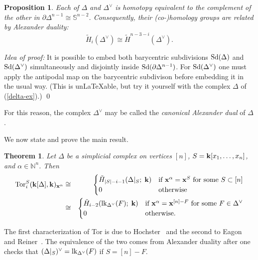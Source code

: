 \documentclass{amsart}
\newtheorem{thm}[defn]{Theorem}
\newtheorem{prop}[defn]{Proposition}
\newcommand{\link}{\mathop{\rm lk}\nolimits}
\newcommand{\Tor}{\mathop{\rm Tor}\nolimits}
\newcommand{\Sd}{\mathop{\rm Sd}\nolimits}
\newcommand{\fld}{{\bf k}}
\newcommand{\isom}{\cong}
\newcommand{\NN}{{\mathbb N}}
\renewcommand{\SS}{{\mathbb S}}
\newcommand{\xx}{{\bf x}}
\newcommand{\defterm}[1] {{\it #1\/}}
\begin{document}
\begin{prop}
Each of $\Delta$ and $\Delta^\vee$ is homotopy equivalent to the complement of the other in
$\partial\Delta^{n-1} \isom \SS^{n-2}$.  Consequently, their (co-)homology groups
are related by \defterm{Alexander duality}:
$$
\tilde{H}_i(\Delta^\vee) \cong \tilde{H}^{n-3-i}(\Delta^\vee).
$$
\end{prop}

{\it Idea of proof:} It is possible to embed both barycentric subdivisions
$\Sd(\Delta)$ and $\Sd(\Delta^\vee)$ simultaneously and disjointly inside 
$\Sd(\partial\Delta^{n-1})$.  For $\Sd(\Delta^\vee)$ one must apply the
antipodal map on the barycentric subdivison before embedding it in the usual
way.   (This is unLaTeXable, but try it yourself with the complex 
$\Delta$ of (\ref{delta-ex}).) \qed

For this reason, the complex $\Delta^\vee$ may be called the \defterm{canonical Alexander 
dual} of $\Delta$.


We now state and prove the main result.

\begin{thm} \label{thetheorem} Let $\Delta$ be a simplicial complex on vertices $[n]$, $S = 
\fld[x_1,\dots,x_n]$, and $\alpha \in \NN^n$.  Then
	\begin{eqnarray*}
	\Tor^S_i(\fld[\Delta],\fld)_{\xx^\alpha} &\isom& \begin{cases}
		\tilde H_{|S|-i-1}(\Delta|_S; \; \fld) &
		  \text{if}~ \xx^\alpha = \xx^S ~\text{for some}~ S \subset [n] \\
		0 & \text{otherwise} \end{cases} \\
	&\isom& \begin{cases}
		\tilde H_{i-2}(\link_{\Delta^\vee}(F); \; \fld) &
		  \text{if}~ \xx^\alpha = \xx^{[n]-F} ~\text{for some}~ F \in \Delta^\vee \\
		0 & \text{otherwise.} \end{cases} \\
	\end{eqnarray*}
\end{thm}

The first characterization of Tor is due to Hochster~\cite{Hoc} and the second to Eagon and
Reiner~\cite{ER}.  The equivalence of the two comes from Alexander duality
after one checks that 
$(\Delta|_S)^\vee = \link_{\Delta^\vee}(F)$ if $S = [n]-F$.
\end{document}
